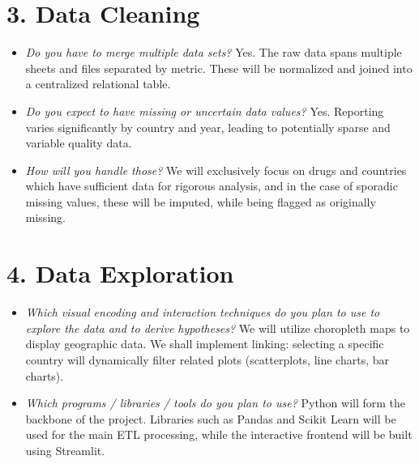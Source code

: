 \documentclass[a4paper,12pt]{article}
\begin{document}
\section{3. Data Cleaning}
\begin{itemize}[leftmargin=1.5em]
    \item \textit{Do you have to merge multiple data sets?}
          Yes. The raw data spans multiple sheets and files separated by metric. These will be normalized and joined into a centralized relational table.

    \item \textit{Do you expect to have missing or uncertain data values?}
          Yes. Reporting varies significantly by country and year, leading to potentially sparse and variable quality data.

    \item \textit{How will you handle those?}
          We will exclusively focus on drugs and countries which have sufficient data for rigorous analysis, and in the case of sporadic missing values, these will be imputed, while being flagged as originally missing.
\end{itemize}

\section{4. Data Exploration}
\begin{itemize}[leftmargin=1.5em]
    \item \textit{Which visual encoding and interaction techniques do you
          plan to use to explore the data and to derive hypotheses?}
          We will utilize choropleth maps to display geographic data. We shall implement linking: selecting a specific country will dynamically filter related plots (scatterplots, line charts, bar charts).

    \item \textit{Which programs / libraries / tools do you plan to use?}
          Python will form the backbone of the project. Libraries such as Pandas and Scikit Learn will be used for the main ETL processing, while the interactive frontend will be built using Streamlit.
\end{itemize}
\end{document}

